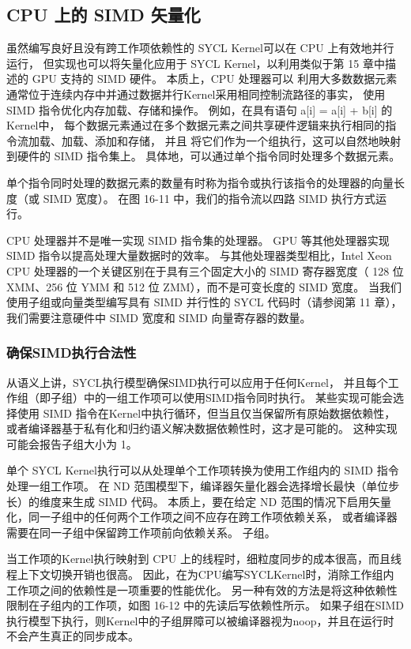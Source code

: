 \subsection{CPU 上的 SIMD 矢量化}
虽然编写良好且没有跨工作项依赖性的 SYCL Kernel可以在 CPU 上有效地并行运行，
但实现也可以将矢量化应用于 SYCL Kernel，以利用类似于第 15 章中描述的 GPU 支持的 SIMD 硬件。
本质上，CPU 处理器可以 利用大多数数据元素通常位于连续内存中并通过数据并行Kernel采用相同控制流路径的事实，
使用 SIMD 指令优化内存加载、存储和操作。 
例如，在具有语句 a[i] = a[i] + b[i] 的Kernel中，
每个数据元素通过在多个数据元素之间共享硬件逻辑来执行相同的指令流加载、加载、添加和存储，
并且 将它们作为一个组执行，这可以自然地映射到硬件的 SIMD 指令集上。 
具体地，可以通过单个指令同时处理多个数据元素。

单个指令同时处理的数据元素的数量有时称为指令或执行该指令的处理器的向量长度（或 SIMD 宽度）。 
在图 16-11 中，我们的指令流以四路 SIMD 执行方式运行。

CPU 处理器并不是唯一实现 SIMD 指令集的处理器。 GPU 等其他处理器实现 SIMD 指令以提高处理大量数据时的效率。 
与其他处理器类型相比，Intel Xeon CPU 处理器的一个关键区别在于具有三个固定大小的 SIMD 寄存器宽度（
128 位 XMM、256 位 YMM 和 512 位 ZMM），而不是可变长度的 SIMD 宽度。 
当我们使用子组或向量类型编写具有 SIMD 并行性的 SYCL 代码时（请参阅第 11 章），
我们需要注意硬件中 SIMD 宽度和 SIMD 向量寄存器的数量。

\subsubsection{确保SIMD执行合法性}
从语义上讲，SYCL执行模型确保SIMD执行可以应用于任何Kernel，
并且每个工作组（即子组）中的一组工作项可以使用SIMD指令同时执行。 
某些实现可能会选择使用 SIMD 指令在Kernel中执行循环，但当且仅当保留所有原始数据依赖性，
或者编译器基于私有化和归约语义解决数据依赖性时，这才是可能的。 这种实现可能会报告子组大小为 1。

单个 SYCL Kernel执行可以从处理单个工作项转换为使用工作组内的 SIMD 指令处理一组工作项。 
在 ND 范围模型下，编译器矢量化器会选择增长最快（单位步长）的维度来生成 SIMD 代码。 
本质上，要在给定 ND 范围的情况下启用矢量化，同一子组中的任何两个工作项之间不应存在跨工作项依赖关系，
或者编译器需要在同一子组中保留跨工作项前向依赖关系。 子组。

当工作项的Kernel执行映射到 CPU 上的线程时，细粒度同步的成本很高，而且线程上下文切换开销也很高。 
因此，在为CPU编写SYCLKernel时，消除工作组内工作项之间的依赖性是一项重要的性能优化。 
另一种有效的方法是将这种依赖性限制在子组内的工作项，如图 16-12 中的先读后写依赖性所示。 
如果子组在SIMD执行模型下执行，则Kernel中的子组屏障可以被编译器视为noop，并且在运行时不会产生真正的同步成本。


